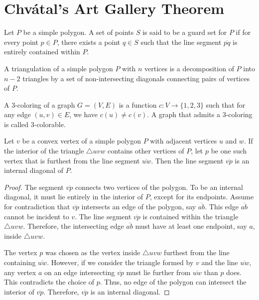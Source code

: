 \chapter{Chvátal's Art Gallery Theorem}

\begin{definition}
    \label{def:Guard_Set}
    Let $P$ be a simple polygon. A set of points $S$ is said to be a guard set for $P$ if for every point $p \in P$, there exists a point $q \in S$ such that the line segment $\overline{pq}$ is entirely contained within $P$.
\end{definition}

\begin{definition}
    \label{def:Polygon_Triangulation}
    A triangulation of a simple polygon $P$ with $n$ vertices is a decomposition of $P$ into $n-2$ triangles by a set of non-intersecting diagonals connecting pairs of vertices of $P$.
\end{definition}

\begin{definition}
    \label{def:3-Coloring_of_a_Graph}
    A 3-coloring of a graph $G = (V, E)$ is a function $c: V \to \{1, 2, 3\}$ such that for any edge $(u, v) \in E$, we have $c(u) \neq c(v)$. A graph that admits a 3-coloring is called 3-colorable.
\end{definition}

\begin{lemma}
    \label{lem:Finding_a_Specific_Internal_Diagonal}
    Let $v$ be a convex vertex of a simple polygon $P$ with adjacent vertices $u$ and $w$. If the interior of the triangle $\triangle uvw$ contains other vertices of $P$, let $p$ be one such vertex that is furthest from the line segment $\overline{uw}$. Then the line segment $\overline{vp}$ is an internal diagonal of $P$.
\end{lemma}

\begin{proof}
    The segment $\overline{vp}$ connects two vertices of the polygon. To be an internal diagonal, it must lie entirely in the interior of $P$, except for its endpoints. Assume for contradiction that $\overline{vp}$ intersects an edge of the polygon, say $\overline{ab}$. This edge $\overline{ab}$ cannot be incident to $v$. The line segment $\overline{vp}$ is contained within the triangle $\triangle uvw$. Therefore, the intersecting edge $\overline{ab}$ must have at least one endpoint, say $a$, inside $\triangle uvw$.
    
    The vertex $p$ was chosen as the vertex inside $\triangle uvw$ furthest from the line containing $\overline{uw}$. However, if we consider the triangle formed by $v$ and the line $\overline{uw}$, any vertex $a$ on an edge intersecting $\overline{vp}$ must lie further from $\overline{uw}$ than $p$ does. This contradicts the choice of $p$. Thus, no edge of the polygon can intersect the interior of $\overline{vp}$. Therefore, $\overline{vp}$ is an internal diagonal.
\end{proof}

